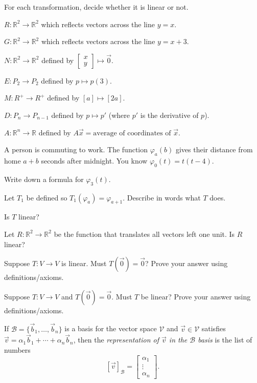 \documentclass[14pt]{problemset}
\newcommand{\R}{\mathbb{R}}
\newcommand{\mat}[1]{\begin{bmatrix}#1\end{bmatrix}}
\begin{document}
	\question
	For each transformation, decide whether it is linear or not.
	\begin{parts}
		\item $R:\R^2\to\R^2$ which reflects vectors across the line $y=x$.
		\item $G:\R^2\to\R^2$ which reflects vectors across the line $y=x+3$.
		\item $N:\R^2\to\R^2$ defined by $\mat{x\\y}\mapsto \vec 0$.
		\item $E:P_2\to P_2$ defined by $p\mapsto p(3)$.
		\item $M:R^+\to R^+$ defined by $[a]\mapsto [2a]$.
		\item $D:P_n\to P_{n-1}$ defined by $p\mapsto p'$ (where $p'$ is the derivative of $p$).
		\item $A:\R^n\to \R$ defined by $A\vec x=\text{average of coordinates of }\vec x$.
	\end{parts}

	\question
	A person is commuting to work. The function $\varphi_a(b)$ gives their distance from home
	$a+b$ seconds after midnight. You know $\varphi_0(t)=t(t-4)$.
	\begin{parts}
		\item Write down a formula for $\varphi_3(t)$.
		\item Let $T_1$ be defined so $T_1(\varphi_a) = \varphi_{a+1}$. Describe in words what $T$ does.
		\item Is $T$ linear?
		\item Let $R:\R^2\to\R^2$ be the function that translates all vectors left one unit.
			Is $R$ linear?
	\end{parts}

	\question
	\begin{parts}
		\item Suppose $T:V\to V$ is linear. Must $T(\vec 0) = \vec 0$? Prove your answer using definitions/axioms.
		\item Suppose $T:V\to V$ and $T(\vec 0)=\vec 0$. Must $T$ be linear? Prove your answer using definitions/axioms.
	\end{parts}

	\begin{definition}
		If $\mathcal B=\{\vec b_1,\ldots,\vec b_n\}$ is a basis for the vector space $\mathcal V$ and $\vec v\in\mathcal V$
		satisfies $\vec v=\alpha_1\vec b_1+\cdots+\alpha_n\vec b_n$, then the \emph{representation of $\vec v$ in
		the $\mathcal B$ basis} is the list of numbers
		\[
			[\vec v]_{\mathcal B} = \mat{\alpha_1\\\vdots\\\alpha_n}.
		\]
	\end{definition}
\end{document}
